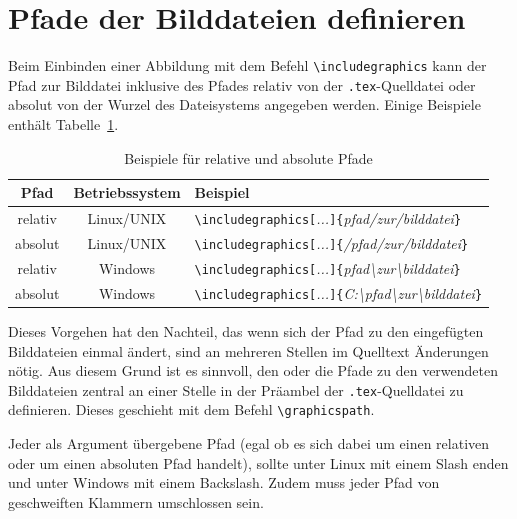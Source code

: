 \documentclass[a4paper,10pt,twoside]{scrbook}
\begin{document}
\section{Pfade der Bilddateien definieren}

Beim Einbinden einer Abbildung mit dem Befehl \verb!\includegraphics! kann der Pfad zur Bilddatei inklusive des Pfades relativ von der \verb!.tex!-Quelldatei oder absolut von der Wurzel des Dateisystems angegeben werden. Einige Beispiele enthält Tabelle~\ref{Tabelle_Relative_und_Absolute_Pfade}.



\begin{table}[h!tb]
\centering
\caption{Beispiele für relative und absolute Pfade}
\label{Tabelle_Relative_und_Absolute_Pfade}
\begin{tabular}{ccl}
\hline
\textbf{Pfad} & \textbf{Betriebssystem} & \textbf{Beispiel} \\
\hline
relativ & Linux/UNIX   & \texttt{\textbackslash includegraphics[}\textsl{...}\texttt{]\{}\textsl{pfad/zur/bilddatei}\texttt{\}} \\
absolut & Linux/UNIX   & \texttt{\textbackslash includegraphics[}\textsl{...}\texttt{]\{}\textsl{/pfad/zur/bilddatei}\texttt{\}} \\
relativ & Windows & \texttt{\textbackslash includegraphics[}\textsl{...}\texttt{]\{}\textsl{pfad\textbackslash zur\textbackslash bilddatei}\texttt{\}}  \\
absolut & Windows & \texttt{\textbackslash includegraphics[}\textsl{...}\texttt{]\{}\textsl{C:\textbackslash pfad\textbackslash zur\textbackslash bilddatei}\texttt{\}}  \\
\hline
\end{tabular}
\end{table}


Dieses Vorgehen hat den Nachteil, das wenn sich der Pfad zu den eingefügten Bilddateien  einmal ändert, sind an mehreren Stellen im Quelltext Änderungen nötig. Aus diesem Grund ist es sinnvoll, den oder die Pfade zu den verwendeten Bilddateien zentral an einer Stelle in der Präambel der \verb!.tex!-Quelldatei zu definieren. Dieses geschieht mit dem Befehl \verb!\graphicspath!. 



Jeder als Argument übergebene Pfad (egal ob es sich dabei um einen relativen oder um einen absoluten Pfad handelt), sollte unter Linux mit einem Slash enden und unter Windows mit einem Backslash. Zudem muss jeder Pfad von geschweiften Klammern umschlossen sein.
\end{document}
